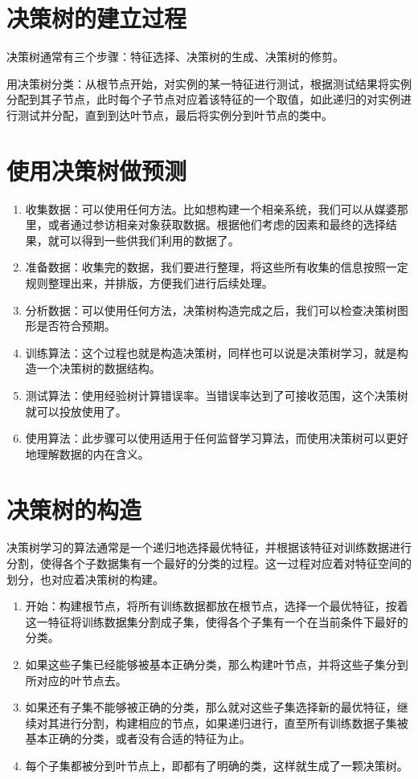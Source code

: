 \documentclass{ML}
\begin{document}
\section{决策树的建立过程}
决策树通常有三个步骤：特征选择、决策树的生成、决策树的修剪。

用决策树分类：从根节点开始，对实例的某一特征进行测试，根据测试结果将实例分配到其子节点，此时每个子节点对应着该特征的一个取值，如此递归的对实例进行测试并分配，直到到达叶节点，最后将实例分到叶节点的类中。

\section{使用决策树做预测}

\begin{enumerate}
	\item 收集数据：可以使用任何方法。比如想构建一个相亲系统，我们可以从媒婆那里，或者通过参访相亲对象获取数据。根据他们考虑的因素和最终的选择结果，就可以得到一些供我们利用的数据了。
	\item 准备数据：收集完的数据，我们要进行整理，将这些所有收集的信息按照一定规则整理出来，并排版，方便我们进行后续处理。
	\item 分析数据：可以使用任何方法，决策树构造完成之后，我们可以检查决策树图形是否符合预期。
	\item 训练算法：这个过程也就是构造决策树，同样也可以说是决策树学习，就是构造一个决策树的数据结构。
	\item 测试算法：使用经验树计算错误率。当错误率达到了可接收范围，这个决策树就可以投放使用了。
	\item 使用算法：此步骤可以使用适用于任何监督学习算法，而使用决策树可以更好地理解数据的内在含义。
\end{enumerate}

\section{决策树的构造}
决策树学习的算法通常是一个递归地选择最优特征，并根据该特征对训练数据进行分割，使得各个子数据集有一个最好的分类的过程。这一过程对应着对特征空间的划分，也对应着决策树的构建。

\begin{enumerate}
	\item 开始：构建根节点，将所有训练数据都放在根节点，选择一个最优特征，按着这一特征将训练数据集分割成子集，使得各个子集有一个在当前条件下最好的分类。
	\item 如果这些子集已经能够被基本正确分类，那么构建叶节点，并将这些子集分到所对应的叶节点去。
	\item 如果还有子集不能够被正确的分类，那么就对这些子集选择新的最优特征，继续对其进行分割，构建相应的节点，如果递归进行，直至所有训练数据子集被基本正确的分类，或者没有合适的特征为止。
	\item 每个子集都被分到叶节点上，即都有了明确的类，这样就生成了一颗决策树。
\end{enumerate}
\end{document}
